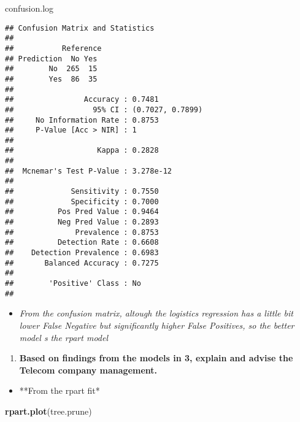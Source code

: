 \documentclass[]{article}
\newenvironment{Shaded}{\begin{snugshade}}{\end{snugshade}}
\newcommand{\KeywordTok}[1]{\textcolor[rgb]{0.13,0.29,0.53}{\textbf{#1}}}
\newcommand{\NormalTok}[1]{#1}
\providecommand{\tightlist}{%
  \setlength{\itemsep}{0pt}\setlength{\parskip}{0pt}}
\begin{document}
\begin{Shaded}
\begin{Highlighting}[]
\NormalTok{confusion.log}
\end{Highlighting}
\end{Shaded}

\begin{verbatim}
## Confusion Matrix and Statistics
## 
##           Reference
## Prediction  No Yes
##        No  265  15
##        Yes  86  35
##                                           
##                Accuracy : 0.7481          
##                  95% CI : (0.7027, 0.7899)
##     No Information Rate : 0.8753          
##     P-Value [Acc > NIR] : 1               
##                                           
##                   Kappa : 0.2828          
##                                           
##  Mcnemar's Test P-Value : 3.278e-12       
##                                           
##             Sensitivity : 0.7550          
##             Specificity : 0.7000          
##          Pos Pred Value : 0.9464          
##          Neg Pred Value : 0.2893          
##              Prevalence : 0.8753          
##          Detection Rate : 0.6608          
##    Detection Prevalence : 0.6983          
##       Balanced Accuracy : 0.7275          
##                                           
##        'Positive' Class : No              
## 
\end{verbatim}

\begin{itemize}
\tightlist
\item
  \emph{From the confusion matrix, altough the logistics regression has
  a little bit lower False Negative but significantly higher False
  Positives, so the better model s the rpart model}
\end{itemize}

\begin{enumerate}
\def\labelenumi{\arabic{enumi}.}
\setcounter{enumi}{3}
\tightlist
\item
  \textbf{Based on findings from the models in 3, explain and advise the
  Telecom company management.}
\end{enumerate}

\begin{itemize}
\tightlist
\item
  **From the rpart fit*
\end{itemize}

\begin{Shaded}
\begin{Highlighting}[]
\KeywordTok{rpart.plot}\NormalTok{(tree.prune)}
\end{Highlighting}
\end{Shaded}
\end{document}
